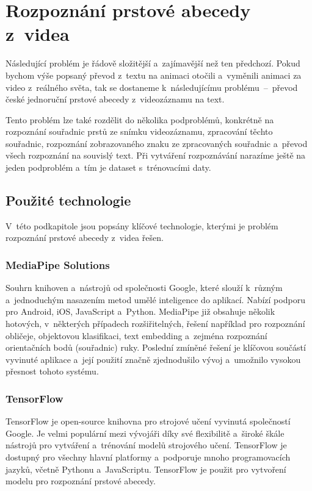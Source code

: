 \documentclass[
  master,
  program=ainfvs,
  biblatex,
  figures=true,
  tables=false,
  sourcecodes=true,
  glossaries,
  index
]{kidiplom}
\begin{document}
\clearpage



\section{Rozpoznání prstové abecedy z~videa}
    Následující problém je řádově složitější a~zajímavější než ten předchozí. Pokud bychom výše popsaný převod z~textu na animaci otočili a~vyměnili animaci za video z~reálného světa, tak se dostaneme k~následujícímu problému~--~převod české jednoruční prstové abecedy z~videozáznamu na text.

    Tento problém lze také rozdělit do několika podproblémů, konkrétně na rozpoznání souřadnic prstů ze snímku videozáznamu, zpracování těchto souřadnic, rozpoznání zobrazovaného znaku ze zpracovaných souřadnic a~převod všech rozpoznání na souvislý text. Při vytváření rozpoznávání narazíme ještě na jeden podproblém a~tím je dataset s~trénovacími daty.
        
    \subsection{Použité technologie}
        V~této podkapitole jsou popsány klíčové technologie, kterými je problém rozpoznání prstové abecedy z~videa řešen.
        
        \subsubsection{MediaPipe Solutions}
                Souhrn knihoven a~nástrojů od společnosti Google, které slouží k~různým a~jednoduchým nasazením metod umělé inteligence do aplikací. Nabízí podporu pro Android, iOS, JavaScript a~Python. MediaPipe již obsahuje několik hotových, v~některých případech rozšiřitelných, řešení například pro rozpoznání obličeje, objektovou klasifikaci, text embedding a~zejména rozpoznání orientačních bodů (souřadnic) ruky. Poslední zmíněné řešení je klíčovou součástí vyvinuté aplikace a~její použití značně zjednodušilo vývoj a~umožnilo vysokou přesnost tohoto systému. \cite{mediapipe}
                
        \subsubsection{TensorFlow}
                TensorFlow je open-source knihovna pro strojové učení vyvinutá společností Google. Je velmi populární mezi vývojáři díky své flexibilitě a~široké škále nástrojů pro vytváření a~trénování modelů strojového učení. TensorFlow je dostupný pro všechny hlavní platformy a~podporuje mnoho programovacích jazyků, včetně Pythonu a~JavaScriptu. TensorFlow je použit pro vytvoření modelu pro rozpoznání prstové abecedy. \cite{tensorflow}
                
\end{document}
